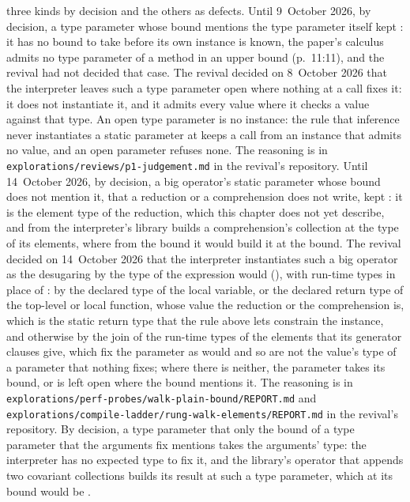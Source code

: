 \begin{description}
three kinds by decision and the others as defects.
Until 9~October 2026, by decision, a type parameter whose bound mentions the
type parameter itself kept : it has no bound to take before its
own instance is known, the paper's calculus admits no type parameter of a
method in an upper bound (p.~11:11), and the revival had not decided that case.
The revival decided on 8~October 2026 that the interpreter leaves such a type
parameter open where nothing at a call fixes it: it does not instantiate it,
and it admits every value where it checks a value against that type.
An open type parameter is no instance: the rule that inference never
instantiates a static parameter at  keeps a call from an
instance that admits no value, and an open parameter refuses none.
The reasoning is in \nolinkurl{explorations/reviews/p1-judgement.md} in the
revival's repository.
Until 14~October 2026, by decision, a big operator's static parameter whose
bound does not mention it, that a reduction or a comprehension does not write,
kept : it is the element type of the reduction, which this
chapter does not yet describe, and from  the interpreter's
library builds a comprehension's collection at the type of its elements, where
from the bound it would build it at the bound.
The revival decided on 14~October 2026 that the interpreter instantiates such a
big operator as the desugaring by the type  of the expression would
(), with run-time types in place of : by the
declared type of the local variable, or the declared return type of the
top-level or local function, whose value the reduction or the comprehension is,
which is the static return type that the rule above lets
constrain the instance, and otherwise by the join of the run-time types of the
elements that its generator clauses give, which fix the parameter as 
would and so are not the value's type of a parameter that nothing fixes; where
there is neither, the parameter takes its bound, or is left open where the
bound mentions it.
The reasoning is in
\nolinkurl{explorations/perf-probes/walk-plain-bound/REPORT.md} and
\nolinkurl{explorations/compile-ladder/rung-walk-elements/REPORT.md} in the
revival's repository.
By decision, a type parameter that only the bound of a type parameter that the
arguments fix mentions takes the arguments' type: the interpreter has no
expected type to fix it, and the library's operator that appends two covariant
collections builds its result at such a type parameter, which at its bound
would be .

\end{description}
